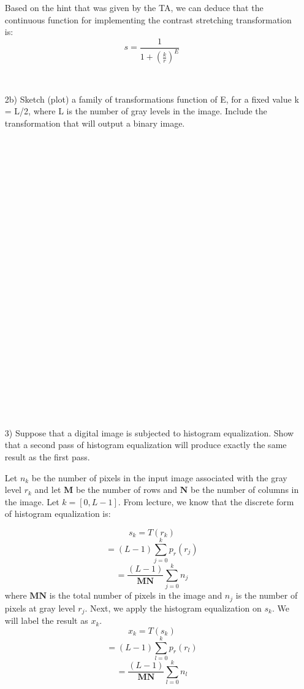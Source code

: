 \documentclass{article}
\begin{document}
\begin{enumerate}
Based on the hint that was given by the TA, we can deduce that the continuous function for implementing
the contrast stretching transformation is:
\begin{equation}
s=\frac{1}{1+(\frac{k}{r})^E}
\end{equation}

\item[~]

\item[2b)] Sketch (plot) a family of transformations function of E, for a fixed
value k = L/2, where L is the number of gray levels in the image. Include
the transformation that will output a binary image.

\item[~]
\item[~]
\item[~]
\item[~]
\item[~]
\item[~]
\item[~]
\item[~]
\item[~]
\item[~]
\item[~]
\item[~]
\item[~]
\item[~]

\item[3)] Suppose that a digital image is subjected to histogram equalization.
Show that a second pass of histogram equalization will produce exactly the
same result as the first pass.

Let $n_k$ be the number of pixels in the input image associated with the gray level $r_k$ and let $\textbf{M}$ be the number of 
rows and $\textbf{N}$ be the number of columns in the image.  Let $k=[0,L-1]$. From lecture, we know that the discrete form 
of histogram equalization is:

\begin{equation}
s_k=T(r_k)
\end{equation}
\begin{equation}
= (L-1) \sum_{j=0}^{k}p_r(r_j)
\end{equation}
\begin{equation}
= \frac{(L-1)}{\textbf{MN}} \sum_{j=0}^{k}n_j
\end{equation}
where $\textbf{MN}$ is the total number of pixels in the image and $n_j$ is the number of pixels at gray level $r_j$.
Next, we apply the histogram equalization on $s_k$.  We will label the result as $x_k$.
\begin{equation}
x_k=T(s_k)
\end{equation}
\begin{equation}
= (L-1)\sum_{l=0}^{k}p_r(r_l)
\end{equation}
\begin{equation}
= \frac{(L-1)}{\textbf{MN}} \sum_{l=0}^{k}n_l
\end{equation}


\end{enumerate}
\end{document}
